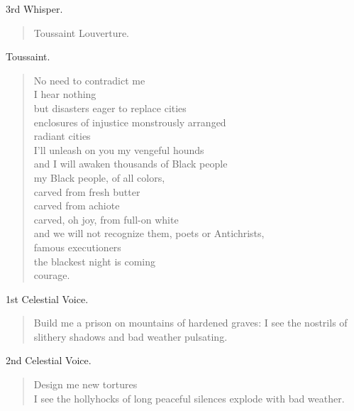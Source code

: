 \documentclass[letterpaper,article,12pt,oneside,notitlepage]{memoir}
\begin{document}
\begin{center}3rd Whisper.\end{center}

\begin{verse}
\hspace{1cm} Toussaint Louverture. \\
\end{verse}

\begin{center}Toussaint.\end{center}

\begin{verse}
No need to contradict me \\
I hear nothing \\
but disasters eager to replace cities \\
enclosures of injustice monstrously arranged \\
radiant cities \\
I'll unleash on you my vengeful hounds \\
and I will awaken thousands of Black people \\
my Black people, of all colors, \\
carved from fresh butter \\
carved from achiote \\
carved, oh joy, from full-on white \\
and we will not recognize them, poets or Antichrists, \\
famous executioners \\
the blackest night is coming \\
courage. \\
\end{verse}

\begin{center}1st Celestial Voice.\end{center}

\begin{verse}
\indent Build me a prison on mountains of hardened graves: I see the nostrils of slithery shadows and bad weather pulsating. \\
\end{verse}

\begin{center}2nd Celestial Voice.\end{center}

\begin{verse}
\hspace{1cm} Design me new tortures \\
I see the hollyhocks of long peaceful silences explode with bad weather. \\
\end{verse}
\end{document}
